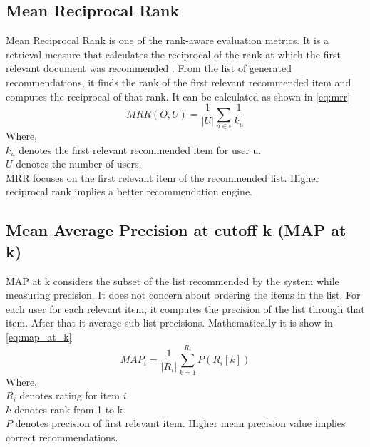 \subsection{Mean Reciprocal Rank}

Mean Reciprocal Rank is one of the rank-aware evaluation metrics.
It is a retrieval measure that calculates the reciprocal of the rank at which the first relevant document was recommended \cite{27}.
From the list of generated recommendations, it finds the rank of the first relevant recommended item and computes the reciprocal of that rank. It can be calculated as shown in \autoref{eq:mrr}
\begin{equation}
MRR(O, U) = \frac{1}{\vert U \vert} \sum_{u \in \epsilon} \frac{1} {k_{u}}
\label{eq:mrr}
\end{equation}
\noindent Where, \\
$k_{u}$ denotes the first relevant recommended item for user u. \\
$U$  denotes the number of users. \\
MRR focuses on the first relevant item of the recommended list. Higher reciprocal rank implies a better recommendation engine.


\subsection{Mean Average Precision at cutoff k (MAP at k)}
MAP at k considers the subset of the list recommended by the system while measuring precision. It does not concern about ordering the items in the list. For each user for each relevant item, it computes the precision of the list through that item. After that it average sub-list precisions. Mathematically it is show in \autoref{eq:map_at_k}
\begin{equation}
MAP_{i} = \frac{1}{\vert R_{i} \vert} \sum_{k=1}^{\vert R_{i} \vert} { P( R_{i}[k]) }
\label{eq:map_at_k}
\end{equation}
\noindent Where, \\
$R_{i}$ denotes rating for item $i$. \\
$k$ denotes rank from 1 to k.\\
$P$ denotes precision of first relevant item.
\noindent Higher mean precision value implies correct recommendations.
